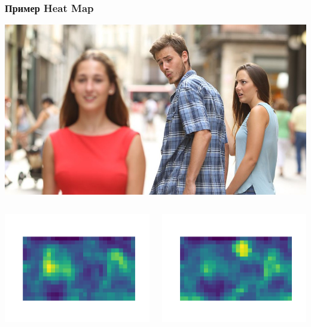 \documentclass{beamer}
\begin{document}
\begin{frame}
	\frametitle{Пример Heat Map}
	\centerline{\includegraphics[scale=0.18]{images/example.jpg}}

	\begin{columns}[c]
		\centerline{\includegraphics[scale=0.28]{images/example_1.png}}

		\centerline{\includegraphics[scale=0.28]{images/example_2.png}}


\end{columns}
\end{frame}
\end{document}
